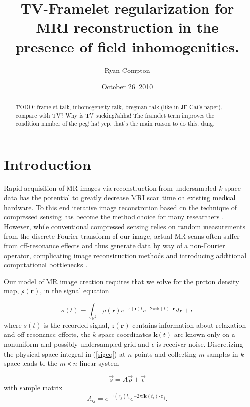 \documentclass[11pt]{amsart}
\title{TV-Framelet regularization for MRI reconstruction in the
presence of field inhomogenities.}
\author{Ryan Compton}
\date{October 26, 2010}
\theoremstyle{remark}
\begin{document}
\begin{abstract}

TODO: framelet talk, inhomogeneity talk, bregman talk (like in JF Cai's paper), compare with TV? Why is TV sucking?ahha! The framelet term improves the condition number of the pcg! ha! yep. that's the main reason to do this. dang.

\end{abstract}

\maketitle

\section{Introduction}

Rapid acquisition of MR images via reconstruction from undersampled $k$-space data has the potential to greatly decrease MRI scan time on existing medical hardware. To this end iterative image reconstrction based on the technique of compressed sensing has become the method choice for many researchers \cite{Lustig2007}. However, while conventional compressed sensing relies on random measurements from the discrete Fourier transform of our image, actual MR scans often suffer from off-resonance effects and thus generate data by way of a non-Fourier operator, complicating image reconstruction methods and introducing additional computational bottlenecks \cite{Fessler2005}.

Our model of MR image creation requires that we solve for the proton density map, $\rho(\mathbf{r})$, in the signal equation

\begin{equation}\label{sigeq}
s(t) = \int_{\mathbb{R}^2} \rho(\mathbf{r})e^{-z(\mathbf{r})t}e^{-2\pi i \mathbf{k}(t) \cdot \mathbf{r}} d\mathbf{r} + \epsilon
\end{equation}
where $s(t)$ is the recorded signal, $z(\mathbf{r})$ contains information about relaxation and off-resonance effects, the $k$-space coordinates $\mathbf{k}(t)$ are known only on a nonuniform and possibly undersampled grid and $\epsilon$ is receiver noise. Discretizing the physical space integral in (\ref{sigeq}) at $n$ points and collecting $m$ samples in $k$-space leads to the $m \times n$ linear system

\begin{equation}\label{dissigeq}
\vec{s} = A \vec{\rho} + \vec{\epsilon}
\end{equation}
with sample matrix
\begin{equation}
A_{ij} = e^{-z(\mathbf{r}_j)t_i}e^{-2\pi i \mathbf{k}(t_i) \cdot \mathbf{r}_j}.
\end{equation}
\end{document}
